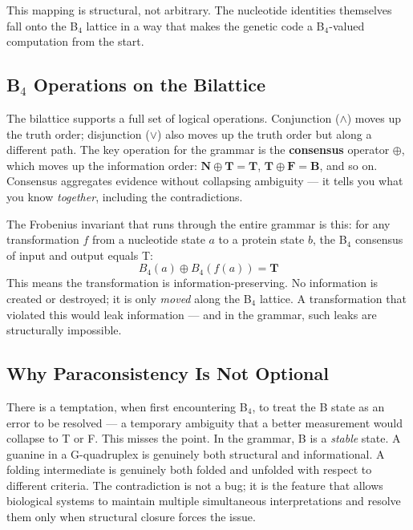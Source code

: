 \documentclass[11pt,a4paper,twocolumn]{article}
\begin{document}
This mapping is structural, not arbitrary. The nucleotide identities themselves fall onto the B$_4$ lattice in a way that makes the genetic code a B$_4$-valued computation from the start.

\subsection{B$_4$ Operations on the Bilattice}

The bilattice supports a full set of logical operations. Conjunction ($\wedge$) moves up the truth order; disjunction ($\vee$) also moves up the truth order but along a different path. The key operation for the grammar is the \textbf{consensus} operator $\oplus$, which moves up the information order: $\mathbf{N} \oplus \mathbf{T} = \mathbf{T}$, $\mathbf{T} \oplus \mathbf{F} = \mathbf{B}$, and so on. Consensus aggregates evidence without collapsing ambiguity — it tells you what you know \emph{together}, including the contradictions.

The Frobenius invariant that runs through the entire grammar is this: for any transformation $f$ from a nucleotide state $a$ to a protein state $b$, the B$_4$ consensus of input and output equals T:
\begin{equation}
B_4(a) \oplus B_4(f(a)) = \mathbf{T}
\end{equation}
This means the transformation is information-preserving. No information is created or destroyed; it is only \emph{moved} along the B$_4$ lattice. A transformation that violated this would leak information — and in the grammar, such leaks are structurally impossible.

\subsection{Why Paraconsistency Is Not Optional}

There is a temptation, when first encountering B$_4$, to treat the B state as an error to be resolved — a temporary ambiguity that a better measurement would collapse to T or F. This misses the point. In the grammar, B is a \emph{stable} state. A guanine in a G-quadruplex is genuinely both structural and informational. A folding intermediate is genuinely both folded and unfolded with respect to different criteria. The contradiction is not a bug; it is the feature that allows biological systems to maintain multiple simultaneous interpretations and resolve them only when structural closure forces the issue.
\end{document}
